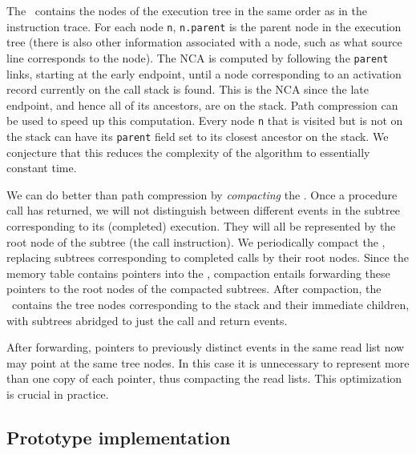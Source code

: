 \documentclass[times, 10pt,twocolumn]{article}
\begin{document}
The \tracepile\ contains the nodes of the execution tree in the same order
as in the instruction trace. For each node {\tt n}, 
{\tt n.parent} is the parent node in the execution tree (there is also 
other information associated with a node, such as what source line 
corresponds to the node).
The NCA is computed by following the {\tt parent} links, starting at the
early endpoint, until a node corresponding to an activation record currently 
on the call stack is found. This is the NCA since the late endpoint, and hence
all of its ancestors, are on the stack.
Path compression can be used to speed up this computation.
Every node {\tt n} that is visited but is not on the stack can have its 
{\tt parent} field set
to its closest ancestor on the stack. We conjecture that this reduces the 
complexity of the algorithm to essentially constant time. 

We can do better than path compression by {\em compacting} the \tracepile. 
Once a procedure call has returned, we will not distinguish between 
different events in the subtree corresponding to its (completed) 
execution. They will all be represented by the root node of the subtree
(the call instruction).
We periodically compact the \tracepile, replacing subtrees
corresponding to completed calls by their root nodes. Since the 
memory table contains pointers into the \tracepile, compaction
entails forwarding these pointers to the root nodes of the compacted 
subtrees.
After compaction, the \tracepile\ contains the
tree nodes corresponding to the stack and their immediate children,
with subtrees abridged to just the call and return events.

After forwarding, pointers to previously distinct events in the same read list 
now may point at the same 
tree nodes. In this case it is unnecessary to represent more than one 
copy of each pointer, thus compacting the read lists. This optimization is 
crucial in practice.

\subsection{Prototype implementation}
\end{document}
